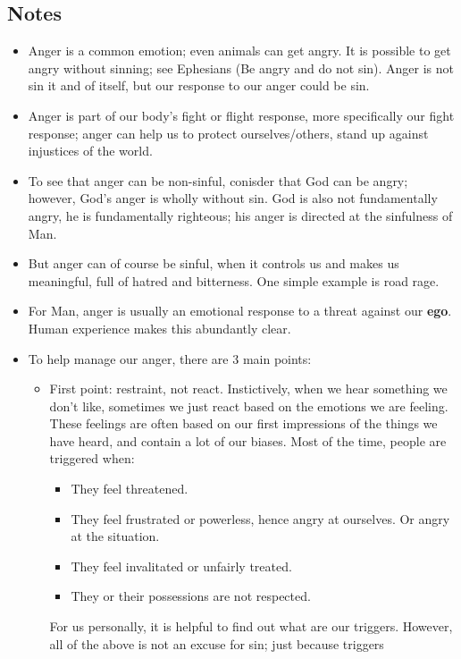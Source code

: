 \subsection*{Notes}
\begin{itemize}
  \item{Anger is a common emotion; even animals can get angry.  It is
    possible to get angry without sinning; see Ephesians (Be angry and do not
    sin).  Anger is not sin it and of itself, but our response to our anger
    could be sin.}
  \item{Anger is part of our body's fight or flight response, more
    specifically our fight response; anger can help us to protect
    ourselves/others, stand up against injustices of the world.}
  \item{To see that anger can be non-sinful, conisder that God can be angry;
    however, God's anger is wholly without sin.  God is also not fundamentally
    angry, he is fundamentally righteous; his anger is directed at the
    sinfulness of Man.}
  \item{But anger can of course be sinful, when it controls us and makes us
    meaningful, full of hatred and bitterness. One simple example is road rage.}
  \item{For Man, anger is usually an emotional response to a threat against
  our \textbf{ego}.  Human experience makes this abundantly clear.}
  \item{To help manage our anger, there are 3 main points:
  \begin{itemize}
    \item{First point: restraint, not react.  Instictively, when we hear
    something we don't like, sometimes we just react based on the emotions we
    are feeling.  These feelings are often based on our first impressions of
    the things we have heard, and contain a lot of our biases. Most of the time, people are triggered when:
    \begin{itemize}
      \item{They feel threatened.}
      \item{They feel frustrated or powerless, hence angry at ourselves.  Or
      angry at the situation.}
      \item{They feel invalitated or unfairly treated.}
      \item{They or their possessions are not respected.}
    \end{itemize}
    For us personally, it is helpful to find out what are our triggers.
    However, all of the above is not an excuse for sin; just because triggers
}
\end{itemize}}
\end{itemize}
